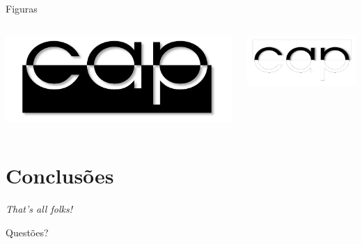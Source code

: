 \documentclass[
    brazilian, %
    12pt, %
    aspectratio = 169, %
]{beamer}
\begin{document}
\begin{frame}{Figuras}
    \begin{columns}
        \begin{column}{0.5\linewidth}
            \includegraphics[width=\linewidth]{cap}
        \end{column}
        \begin{column}{0.5\linewidth}
            \includegraphics[width=\linewidth]{cap_neg}
        \end{column}
    \end{columns}
\end{frame}


\section{Conclusões}
\begin{frame}
    \centering
    \textit{That's all folks!}

    \pause
    \alert{Questões?}
\end{frame}
\end{document}
